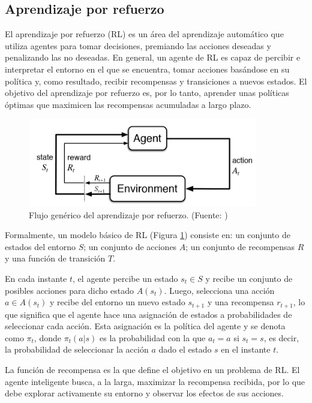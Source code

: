\subsection{Aprendizaje por refuerzo}

El aprendizaje por refuerzo (RL) es un área del aprendizaje automático que utiliza agentes para tomar decisiones, premiando las acciones deseadas y penalizando las no deseadas. En general, un agente de RL es capaz de percibir e interpretar el entorno en el que se encuentra, tomar acciones basándose en su política y, como resultado, recibir recompensas y transiciones a nuevos estados. El objetivo del aprendizaje por refuerzo es, por lo tanto, aprender unas políticas óptimas que maximicen las recompensas acumuladas a largo plazo.

\begin{figure} [H]
    \centering
    \includegraphics[width=10cm]{figures/reinforcement_learning.png}
    \caption[Flujo genérico del aprendizaje por refuerzo]{Flujo genérico del aprendizaje por refuerzo. (Fuente: \parencite{Sutton1998})}
    \label{rl_model}
\end{figure}

Formalmente, un modelo básico de RL (Figura \ref{rl_model}) consiste en: un conjunto de estados del entorno $S$; un conjunto de acciones $A$; un conjunto de recompensas $R$ y una función de transición $T$.

En cada instante $t$, el agente percibe un estado ${s}_{t}\in{S}$ y recibe un conjunto de posibles acciones para dicho estado ${A}({s}_{t})$. Luego, selecciona una acción ${a}\in{A}({s}_{t})$ y recibe del entorno un nuevo estado ${s}_{t+1}$ y una recompensa ${r}_{t+1}$, lo que significa que el agente hace una asignación de estados a probabilidades de seleccionar cada acción. Esta asignación es la política del agente y se denota como $\pi_{t}$, donde $\pi_{t}({a|s})$ es la probabilidad con la que $a_t=a$ si $s_t=s$, es decir, la probabilidad de seleccionar la acción $a$ dado el estado $s$ en el instante $t$.

La función de recompensa es la que define el objetivo en un problema de RL. El agente inteligente busca, a la larga, maximizar la recompensa recibida, por lo que debe explorar activamente su entorno y observar los efectos de sus acciones.



